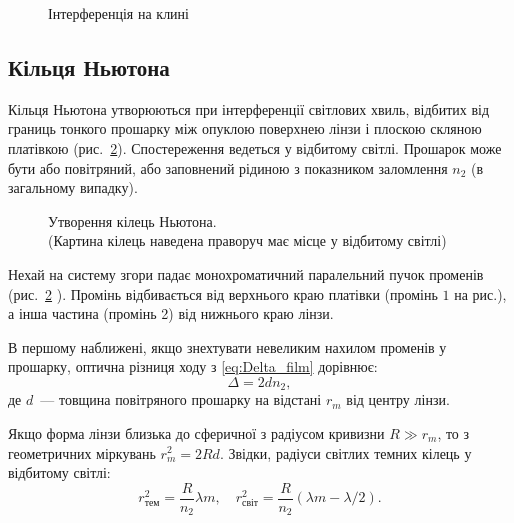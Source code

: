 \begin{figure}[h!]\centering
	
	\caption{Інтерференція на клині}
	\label{pic:klin_interference}
\end{figure}



\subsection*{Кільця Ньютона}


Кільця Ньютона утворюються при інтерференції світлових хвиль, відбитих від границь тонкого прошарку між опуклою поверхнею лінзи і плоскою скляною платівкою (рис.~\ref{pic:Newton_rings}). Спостереження ведеться у відбитому світлі. Прошарок може бути або повітряний, або заповнений рідиною з показником заломлення $n_2$ (в загальному випадку).

\begin{figure}[h!]\centering
	
	\caption{Утворення кілець Ньютона. \\ (Картина кілець наведена праворуч має місце у відбитому світлі)}
	\label{pic:Newton_rings}
\end{figure}

Нехай на систему згори падає монохроматичний паралельний пучок променів (рис.~\ref{pic:Newton_rings} ). Промінь відбивається від верхнього краю платівки (промінь $1$ на рис.), а інша частина (промінь 2) від нижнього краю лінзи.

В першому наближені, якщо знехтувати невеликим нахилом променів у прошарку, оптична різниця ходу з \eqref{eq:Delta_film} дорівнює:
\begin{equation}
	\Delta =2dn_2,
\end{equation}
де $d$~--- товщина повітряного прошарку на відстані $r_m$ від центру лінзи.

Якщо форма лінзи близька до сферичної з радіусом кривизни $R \gg r_m$, то з геометричних міркувань $r^2_m = 2Rd $. Звідки, радіуси світлих темних кілець у відбитому світлі:
\begin{equation}
	\label{rdark}
	r_\text{тем}^2=\frac{R}{n_2}\lambda m, \quad r_\text{світ}^2=\frac{R}{n_2}(\lambda m-\lambda/2).
\end{equation}


